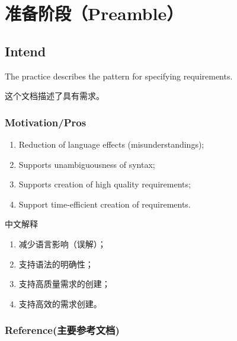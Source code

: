 \chapter{准备阶段（Preamble）}

\section{Intend}
The practice describes the pattern for specifying requirements.

这个文档描述了具有需求。

\subsection{Motivation/Pros}
\begin{enumerate}
	\item Reduction of language effects (misunderstandings);
	\item Supports unambiguousness of syntax;
	\item Supports creation of high quality requirements;
	\item Support time-efficient creation of requirements.
\end{enumerate}
中文解释
\begin{enumerate}[label=\textbullet]
	\item  减少语言影响（误解）；
	\item  支持语法的明确性；
	\item  支持高质量需求的创建；
	\item  支持高效的需求创建。
\end{enumerate}

\subsection{Reference(主要参考文档)}

